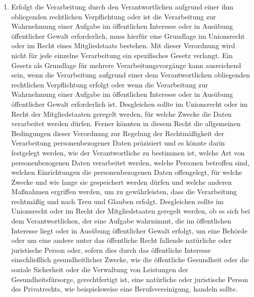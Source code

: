 \begin{enumerate}
   \item Erfolgt die Verarbeitung durch den Verantwortlichen aufgrund einer ihm obliegenden rechtlichen Verpflichtung
    oder ist die Verarbeitung zur Wahrnehmung einer Aufgabe im öffentlichen Interesse oder in Ausübung öffentlicher
    Gewalt erforderlich, muss hierfür eine Grundlage im Unionsrecht oder im Recht eines Mitgliedstaats bestehen. Mit
    dieser Verordnung wird nicht für jede einzelne Verarbeitung ein spezifisches Gesetz verlangt. Ein Gesetz als
    Grundlage für mehrere Verarbeitungsvorgänge kann ausreichend sein, wenn die Verarbeitung aufgrund einer dem
    Verantwortlichen obliegenden rechtlichen Verpflichtung erfolgt oder wenn die Verarbeitung zur Wahrnehmung einer
    Aufgabe im öffentlichen Interesse oder in Ausübung öffentlicher Gewalt erforderlich ist. Desgleichen sollte im
    Unionsrecht oder im Recht der Mitgliedstaaten geregelt werden, für welche Zwecke die Daten verarbeitet werden
    dürfen. Ferner könnten in diesem Recht die allgemeinen Bedingungen dieser Verordnung zur Regelung der
    Rechtmäßigkeit der Verarbeitung personenbezogener Daten präzisiert und es könnte darin festgelegt werden, wie der
    Verantwortliche zu bestimmen ist, welche Art von personenbezogenen Daten verarbeitet werden, welche Personen
    betroffen sind, welchen Einrichtungen die personenbezogenen Daten offengelegt, für welche Zwecke und wie lange sie
    gespeichert werden dürfen und welche anderen Maßnahmen ergriffen werden, um zu gewährleisten, dass die Verarbeitung
    rechtmäßig und nach Treu und Glauben erfolgt. Desgleichen sollte im Unionsrecht oder im Recht der Mitgliedstaaten
    geregelt werden, ob es sich bei dem Verantwortlichen, der eine Aufgabe wahrnimmt, die im öffentlichen Interesse
    liegt oder in Ausübung öffentlicher Gewalt erfolgt, um eine Behörde oder um eine andere unter das öffentliche Recht
    fallende natürliche oder juristische Person oder, sofern dies durch das öffentliche Interesse einschließlich
    gesundheitlicher Zwecke, wie die öffentliche Gesundheit oder die soziale Sicherheit oder die Verwaltung von
    Leistungen der Gesundheitsfürsorge, gerechtfertigt ist, eine natürliche oder juristische Person des Privatrechts,
    wie beispielsweise eine Berufsvereinigung, handeln sollte.%
   \label{eg:45}
   


\end{enumerate}
